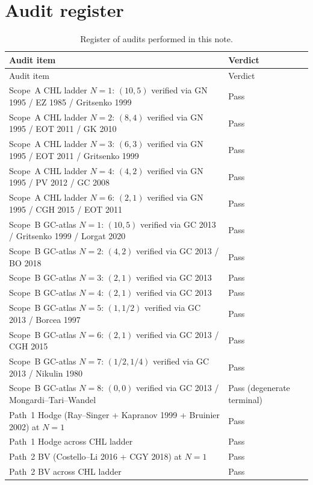 \documentclass[11pt]{article}
\theoremstyle{definition}
\begin{document}
\section{Audit register}
\label{sec:audit-register}

\begin{longtable}{l|l}
\caption{Register of audits performed in this note.}
\label{tab:audit-register} \\
\hline
Audit item & Verdict \\
\hline
\endfirsthead
\hline
Audit item & Verdict \\
\hline
\endhead
Scope~A CHL ladder $N = 1$: $(10, 5)$ verified via GN 1995 / EZ 1985 / Gritsenko 1999
& Pass \\
Scope~A CHL ladder $N = 2$: $(8, 4)$ verified via GN 1995 / EOT 2011 / GK 2010
& Pass \\
Scope~A CHL ladder $N = 3$: $(6, 3)$ verified via GN 1995 / EOT 2011 / Gritsenko 1999
& Pass \\
Scope~A CHL ladder $N = 4$: $(4, 2)$ verified via GN 1995 / PV 2012 / GC 2008
& Pass \\
Scope~A CHL ladder $N = 6$: $(2, 1)$ verified via GN 1995 / CGH 2015 / EOT 2011
& Pass \\
Scope~B GC-atlas $N = 1$: $(10, 5)$ verified via GC 2013 / Gritsenko 1999 / Lorgat 2020
& Pass \\
Scope~B GC-atlas $N = 2$: $(4, 2)$ verified via GC 2013 / BO 2018
& Pass \\
Scope~B GC-atlas $N = 3$: $(2, 1)$ verified via GC 2013
& Pass \\
Scope~B GC-atlas $N = 4$: $(2, 1)$ verified via GC 2013
& Pass \\
Scope~B GC-atlas $N = 5$: $(1, 1/2)$ verified via GC 2013 / Borcea 1997
& Pass \\
Scope~B GC-atlas $N = 6$: $(2, 1)$ verified via GC 2013 / CGH 2015
& Pass \\
Scope~B GC-atlas $N = 7$: $(1/2, 1/4)$ verified via GC 2013 / Nikulin 1980
& Pass \\
Scope~B GC-atlas $N = 8$: $(0, 0)$ verified via GC 2013 / Mongardi--Tari--Wandel
& Pass (degenerate terminal) \\
\hline
Path~1 Hodge (Ray--Singer + Kapranov 1999 + Bruinier 2002) at $N = 1$ & Pass \\
Path~1 Hodge across CHL ladder & Pass \\
Path~2 BV (Costello--Li 2016 + CGY 2018) at $N = 1$ & Pass \\
Path~2 BV across CHL ladder & Pass \\

\end{longtable}
\end{document}
